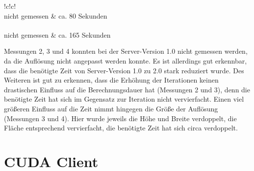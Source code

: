 \documentclass[12pt, onecolumn, notitlepage]{scrartcl}
\begin{document}
\begin{table}[H]
{\begin{tabular}{!{\color{black}\vrule}c!{\color{black}\vrule}c!{\color{black}\vrule}}
			\hline
			    \\ 
			\hline
			nicht
			gemessen     & ca.
			80 Sekunden                                                                                                                                                                            \\ 
			\hline
			        \\ 
			\hline
			nicht
			gemessen     & ca.
			165 Sekunden                                                                                                                                                                           \\
			\hline
		\end{tabular}
	}
	
\end{table}

Messungen 2, 3 und 4 konnten bei der Server-Version 1.0 nicht gemessen werden, da die Auflösung nicht angepasst werden konnte. Es ist allerdings gut erkennbar, dass die benötigte Zeit von Server-Version 1.0 zu 2.0 stark reduziert wurde. Des Weiteren ist gut zu erkennen, dass die Erhöhung der Iterationen keinen drastischen Einfluss auf die Berechnungsdauer hat (Messungen 2 und 3), denn die benötigte Zeit hat sich im Gegensatz zur Iteration nicht vervierfacht. Einen viel größeren Einfluss auf die Zeit nimmt hingegen die Größe der Auflösung (Messungen 3 und 4). Hier wurde jeweils die Höhe und Breite verdoppelt, die Fläche entsprechend vervierfacht, die benötigte Zeit hat sich circa verdoppelt.


\section{CUDA Client}
\end{document}
